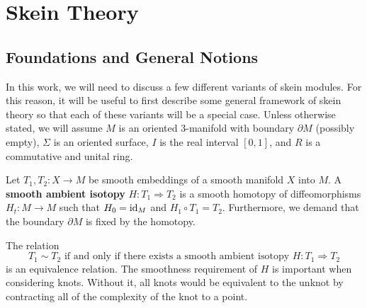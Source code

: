 \chapter{Skein Theory} \label{chapter2}


\section{Foundations and General Notions} \label{sec:foundations}
In this work, we will need to discuss a few different variants of skein modules. For this reason, it will be useful to first describe some general framework of skein theory so that each of these variants will be a special case. Unless otherwise stated, we will assume $M$ is an oriented $3$-manifold with boundary $\partial M$ (possibly empty), $\Sigma$ is an oriented surface, $I$ is the real interval $[0,1]$, and $R$ is a commutative and unital ring. 

\begin{definition}
    Let $T_1, T_2: X \to M$ be smooth embeddings of a smooth manifold $X$ into $M$. A \textbf{smooth ambient isotopy} $H: T_1 \Rightarrow T_2$ is a smooth homotopy of diffeomorphisms $H_t: M \to M$ such that $H_0={\rm{id}}_M$ and $H_1 \circ T_1 = T_2$. Furthermore, we demand that the boundary $\partial M$ is fixed by the homotopy. 
\end{definition}

The relation 
\[
T_1 \sim T_2 \textrm{ if and only if there exists a smooth ambient isotopy } H: T_1 \Rightarrow T_2
\]
is an equivalence relation. The smoothness requirement of $H$ is important when considering knots. Without it, all knots would be equivalent to the unknot by contracting all of the complexity of the knot to a point. 


